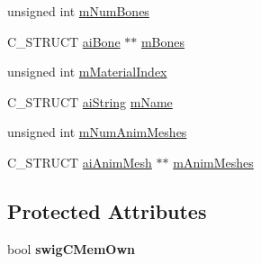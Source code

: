 \begin{DoxyCompactItemize}
unsigned int \hyperlink{structai_mesh_a0f9d5425b6300e32a842a94f943fd79e}{m\+Num\+Bones}
\item 
C\+\_\+\+S\+T\+R\+U\+C\+T \hyperlink{structai_bone}{ai\+Bone} $\ast$$\ast$ \hyperlink{structai_mesh_a0c0582a7f45b340b6a33552c53232539}{m\+Bones}
\item 
unsigned int \hyperlink{structai_mesh_aa2807c7ba172115203ed16047ad65f9e}{m\+Material\+Index}
\item 
C\+\_\+\+S\+T\+R\+U\+C\+T \hyperlink{structai_string}{ai\+String} \hyperlink{structai_mesh_a8dd9433e0c5b008e3e5aee6c801d3b74}{m\+Name}
\item 
unsigned int \hyperlink{structai_mesh_a1692a300222b32348ae51779df4a697e}{m\+Num\+Anim\+Meshes}
\item 
C\+\_\+\+S\+T\+R\+U\+C\+T \hyperlink{structai_anim_mesh}{ai\+Anim\+Mesh} $\ast$$\ast$ \hyperlink{structai_mesh_a5078f7db7e99ed05db89dfa412f0e990}{m\+Anim\+Meshes}
\end{DoxyCompactItemize}
\subsection*{Protected Attributes}
\begin{DoxyCompactItemize}
\item 
\hypertarget{structai_mesh_aaa7e9a96b055c248d7b6637507c64f31}{bool {\bfseries swig\+C\+Mem\+Own}}\label{structai_mesh_aaa7e9a96b055c248d7b6637507c64f31}

\end{DoxyCompactItemize}

